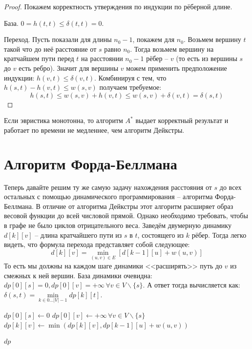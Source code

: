 \begin{proof}
    Покажем корректность утверждения по индукции по рёберной длине.

    База. $0 = h(t, t) \leq \delta(t, t) = 0$.

    Переход. Пусть показали для длины $n_0 - 1$, покажем для $n_0$. Возьмем вершину $t$ такой что до неё расстояние от $s$ равно $n_0$. Тогда возьмем вершину на кратчайшем пути перед $t$ на расстоянии $n_0 - 1$ рёбер -- $v$ (то есть из вершины $s$ до $v$ есть ребро). Значит для вершины $v$ можем применить предположение индукции: $h(v, t) \leq \delta(v, t)$. Комбинируя с тем, что $h(s, t) - h(v, t) \leq w(s, v)$ получаем требуемое:
    \begin{equation*}
        h(s, t) \leq w(s, v) + h(v, t) \leq w(s, v) + \delta(v, t) = \delta(s, t)
    \end{equation*}
\end{proof}

\ThBd Если эвристика монотонна, то алгоритм $A^*$ выдает корректный результат и работает по времени не медленнее, чем алгоритм Дейкстры.

\section{Алгоритм Форда-Беллмана}

Теперь давайте решим ту же самую задачу нахождения расстояния от $s$ до всех остальных с помощью динамического программирования -- алгоритма Форда-Беллмана. В отличие от алгоритма Дейкстры этот алгоритм расширяет образ весовой функции до всей числовой прямой. Однако необходимо требовать, чтобы в графе не было циклов отрицательного веса.
Заведём двумерную динамику $d[k][v]$ -- длина кратчайшего пути из $s$ в $t$, состоящего из $k$ рёбер. Тогда легко видеть, что формула перехода представляет собой следующее:
\begin{equation*}
    d[k][v] = \min\limits_{(u, v) \in E} [ d[k - 1][u] + w(u, v) ]
\end{equation*}
То есть мы должны на каждом шаге динамики <<расширять>> путь до $v$ из смежных к ней вершин. База динамики очевидна: $dp[0][s] = 0, dp[0][v] = +\infty \, \forall v \in V \backslash \{s\}$. А ответ тогда вычисляется как: $\delta(s, t) = \min\limits_{k \in 0 \dots |V| - 1} dp[k][t]$.

\begin{algorithm}[H]
\caption{Алгоритм Форда-Беллмана}
\begin{algorithmic}[1]

    \State $dp[0][s] \gets 0$
    \State $dp[0][v] \gets +\infty\, \forall v \in V \backslash \{s\}$
            \State $dp[k][v] \gets \min(dp[k][v], dp[k-1][u] + w(u, v))$
        \EndFor
    \EndFor

    \State \Return $dp$
\EndFunction
\end{algorithmic}
\end{algorithm}

